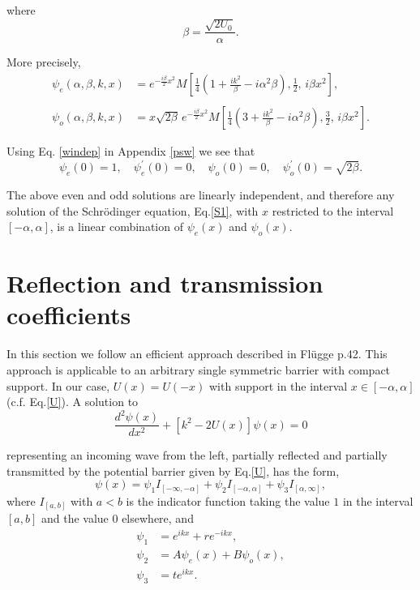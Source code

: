 \documentclass{article}
\numberwithin{equation}{section}
\begin{document}
where
\begin{equation}
\beta=\frac{\sqrt{2U_0}}{\alpha}.\label{beta}
\end{equation}

More precisely,
\begin{align}
\psi_e(\alpha,\beta,k,x)&=e^{-\frac{i\beta}{2}x^2}M\left[\frac{1}{4}\!\left(1+\frac{ik^2}{\beta}-i\alpha^2\beta\right),\frac{1}{2},\,i\beta x^2\right],\label{psie}\\\nonumber\\
\psi_o(\alpha,\beta,k,x)&=x\sqrt{2\beta}\,e^{-\frac{i\beta}{2}x^2}M\left[\frac{1}{4}\!\left(3+\frac{ik^2}{\beta}-i\alpha^2\beta\right),\frac{3}{2},\,i\beta x^2\right].\label{psio}
\end{align}

Using Eq. \eqref{windep} in Appendix \ref{psw} we see that
\begin{equation}
\psi_e(0)=1, \quad \psi_e^\prime(0)=0, \quad \psi_o(0)=0, \quad \psi_o^\prime(0)=\sqrt{2\beta}.\label{Fnorm}
\end{equation}

The above even and odd solutions are linearly independent, and therefore any solution of the Schr\"{o}dinger equation, Eq.\eqref{S1}, with $x$ restricted to the interval $[-\alpha,\alpha]$, is a linear combination of $\psi_e(x)$ and $\psi_o(x)$.

\section{Reflection and transmission coefficients}\label{RT}

In this section we follow an efficient approach described in Fl\"ugge \cite{F94} p.42. This approach is applicable to an arbitrary single symmetric barrier with compact support. In our case, $U(x)=U(-x)$ with support in the interval $x\in\left[-\alpha,\alpha\right]$ (c.f. Eq.\eqref{U}).  A solution to
\begin{equation}
\frac{d^2 \psi(x)}{dx^2}+\left[k^2-2U(x)\right]\psi(x)=0\label{S2}
\end{equation}

representing an incoming wave from the left, partially reflected and partially transmitted by the potential barrier given by Eq.\eqref{U}, has the form,
\begin{equation}
\psi(x)=\psi_{1}I_{\left[-\infty,-\alpha\right]}+\psi_{2}I_{\left[-\alpha,\alpha\right]}+\psi_{3}I_{\left[\alpha,\infty\right]},\label{psiI}
\end{equation}
where $I_{\left[a,b\right]}$ with $a<b$ is the indicator function taking the value $1$ in the interval $[a,b]$ and the value $0$ elsewhere, and 
\begin{align}
\psi_1&=e^{ikx} + re^{-ikx},\label{psi1}\\
\psi_2&=A \psi_e(x) + B \psi_o(x),\label{psi2}\\
\psi_3&=te^{ikx}.\label{psi3}
\end{align}
\end{document}
